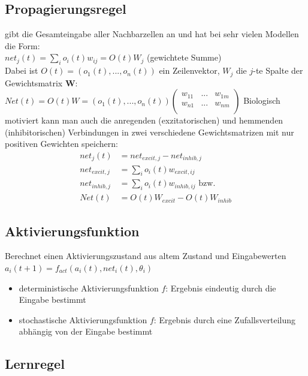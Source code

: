 \subsection*{Propagierungsregel}
gibt die Gesamteingabe aller Nachbarzellen an und hat bei sehr vielen Modellen die Form:\\
$net_j(t) = \sum_i o_i(t)w_{ij} = O(t)W_j$ (gewichtete Summe)\\
Dabei ist $O(t) = (o_1(t),...,o_n(t))$ ein Zeilenvektor, $W_j$ die $j$-te Spalte der Gewichtsmatrix $\textbf{W}$:\\
$Net(t) = O(t)W =  (o_1(t),...,o_n(t))\begin{pmatrix}
w_{11} & ... & w_{1m}\\
w_{n1} & ... & w_{nm}\\
\end{pmatrix}$ \newline
Biologisch motiviert kann man auch die anregenden (exzitatorischen) und hemmenden (inhibitorischen) Verbindungen in zwei verschiedene Gewichtsmatrizen mit nur positiven Gewichten speichern: \\
\begin{align*}
net_j(t) &= net_{excit,j} - net_{inhib,j}\\
net_{excit,j} &= \sum_i o_i(t)w_{excit,ij}\\
net_{inhib,j} &= \sum_i o_i(t)w_{inhib,ij} \text{ bzw. }\\
Net(t) &= O(t)W_{excit} - O(t)W_{inhib}
\end{align*}

\subsection*{Aktivierungsfunktion}
Berechnet einen Aktivierungszustand aus altem Zustand und Eingabewerten\\
$a_i(t+1) = f_{act}(a_i(t), net_i(t), \theta_i)$
\begin{itemize}
\item deterministische Aktivierungsfunktion $f$: Ergebnis eindeutig durch die Eingabe bestimmt
\item stochastische Aktivierungsfunktion $f$: Ergebnis durch eine Zufallsverteilung abhängig von der Eingabe bestimmt
\end{itemize}

\subsection*{Lernregel}

